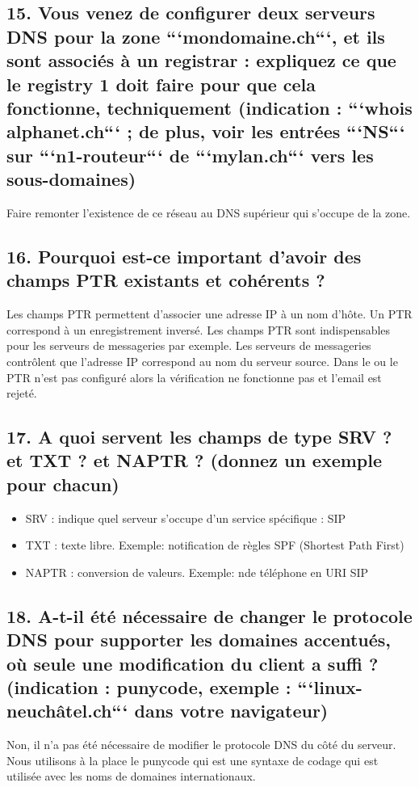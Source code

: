 \documentclass{article}
\begin{document}
\subsection*{15. Vous venez de configurer deux serveurs DNS pour la zone ```mondomaine.ch```, et ils sont associés à un registrar : expliquez ce que le registry 1 doit faire pour que cela fonctionne, techniquement (indication : ```whois alphanet.ch``` ; de plus, voir les entrées ```NS``` sur ```n1-routeur``` de ```mylan.ch``` vers les sous-domaines)}
Faire remonter l'existence de ce réseau au DNS supérieur qui s'occupe de la zone.

\subsection*{16. Pourquoi est-ce important d’avoir des champs PTR existants et cohérents ?}
Les champs PTR permettent d'associer une adresse IP à un nom d'hôte. Un PTR correspond à un enregistrement inversé. Les champs PTR sont indispensables pour les serveurs de messageries par exemple.
Les serveurs de messageries contrôlent que l'adresse IP correspond au nom du serveur source. Dans le ou le PTR n'est pas configuré alors la vérification ne fonctionne pas et l'email est rejeté.

\subsection*{17. A quoi servent les champs de type SRV ? et TXT ? et NAPTR ? (donnez un exemple pour chacun)}
\begin{itemize}
\item SRV : indique quel serveur s'occupe d'un service spécifique : SIP
\item TXT : texte libre. Exemple: notification de règles SPF (Shortest Path First)
\item NAPTR : conversion de valeurs. Exemple: n\degre de téléphone en URI SIP
\end{itemize}

\subsection*{18. A-t-il été nécessaire de changer le protocole DNS pour supporter les domaines accentués, où seule une modification du client a suffi ? (indication : punycode, exemple : ```linux-neuchâtel.ch``` dans votre navigateur)}
Non, il n'a pas été nécessaire de modifier le protocole DNS du côté du serveur. Nous utilisons à la place le punycode qui est une syntaxe de codage qui est utilisée avec les noms de domaines internationaux.
\end{document}
